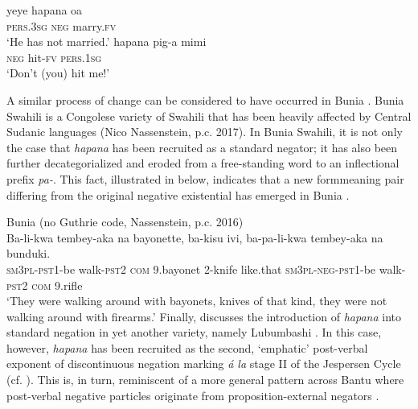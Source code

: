 \documentclass[output=paper,draft,draftmode,colorlinks,citecolor=brown]{langscibook}
\begin{document}
\ea\label{ex:kisetla-marry-hit}

\ea\label{ex:kisetla-marry}
\gll yeye hapana oa\\
	\textsc{pers.3sg} \textsc{neg} marry.\textsc{fv}\\
\glt 	`He has not married.'
\ex\label{ex:kisetla-hit}
\gll hapana pig-a mimi\\
	\textsc{neg} hit-\textsc{fv} \textsc{pers.1sg}\\
\glt 	`Don't (you) hit me!'
\z
\z

A similar process of change can be considered to have occurred in
Bunia . Bunia Swahili is a
Congolese variety of Swahili that has been heavily affected by Central
Sudanic languages (Nico Nassenstein, p.c. 2017). In Bunia Swahili, it is
not only the case that \textit{hapana} has been recruited as a standard
negator; it has also been further decategorialized and eroded from a
free-standing word to an inflectional prefix \textit{pa-}. This fact,
illustrated in  below, indicates that a new form\textendash meaning
pair differing from the original negative existential has emerged in
Bunia .
%

\ea\label{ex:bunia-arms}
Bunia  (no Guthrie code, Nassenstein, p.c. 2016)\\
\gll Ba-li-kwa tembey-aka na bayonette, ba-kisu ivi, ba-pa-li-kwa tembey-aka na bunduki.\\
	\textsc{sm3pl}-\textsc{pst}1-be walk-\textsc{pst}2 \textsc{com} 9.bayonet 2-knife like.that \textsc{sm}3\textsc{pl}-\textsc{neg}-\textsc{pst}1-be walk-\textsc{pst}2 \textsc{com} 9.rifle\\
\glt 	`They were walking around with bayonets, knives of that kind, they were not walking around with firearms.'
\z
%
Finally, \citet{Schicho1992} discusses the introduction of \textit{hapana}
into standard negation in yet another  variety, namely
Lubumbashi . In this case,
however, \textit{hapana} has been recruited as the second, `emphatic'
post-verbal exponent of discontinuous negation marking \textit{\'a la}
stage II of the Jespersen Cycle (cf. \citealt{Auwera2009}). This is, in
turn, reminiscent of a more general pattern across Bantu where post-verbal
negative particles originate from pro\-po\-si\-tion-ex\-ter\-nal negators
\parencite[see][]{DevosAuwera2013}.
%
\end{document}
